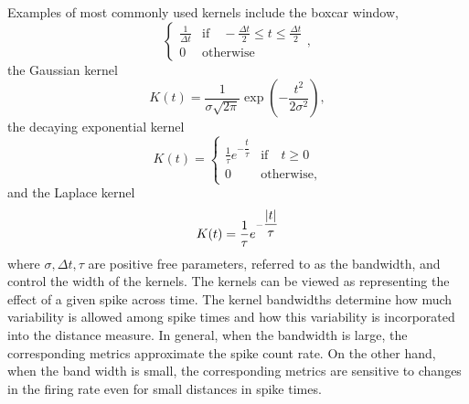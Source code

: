 Examples of most commonly used kernels include the boxcar window,
\[   
\begin{cases} 
    \frac{1}{\Delta t} & \text{if} \quad  -\frac{\Delta t}{2} \leq t \leq \frac{\Delta t}{2} \\
0 & \text{otherwise}        
\end{cases},
\]
the Gaussian kernel
\[
K(t) = \frac{1}{\sigma \sqrt{2\pi}} \exp(-\dfrac{t^{2}}{2\sigma^2}),
\]
the decaying exponential kernel
\[
K(t) = \begin{cases} 
    \frac{1}{\tau}e^{-\dfrac{t}{\tau}} & \text{if} \quad t \geq 0  \\
0 & \text{otherwise},        
\end{cases}
\]
and the Laplace kernel
\[
K(t) = \frac{1}{\tau}e^{-\dfrac{\lvert t\rvert}{\tau}}  
\]
where $\sigma, \Delta t, \tau$ are positive free parameters, referred to as the bandwidth, and control the width of the kernels.
The kernels can be viewed as representing the effect of a given spike across time. The kernel bandwidths determine how much variability is allowed among spike times and how this variability is incorporated into the distance measure.
In general, when the bandwidth is large, the corresponding metrics approximate
the spike count rate. On the other hand, when the band width is small, the corresponding metrics are sensitive to changes in the firing rate even for small distances in spike times.





